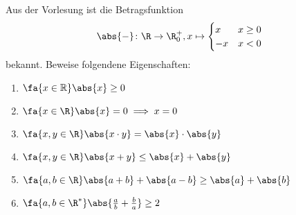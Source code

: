 \begin{exercise}
  Aus der Vorlesung ist die Betragsfunktion 
  \[
    \abs{{-}} \colon \R \to \R^{+}_{0}, x \mapsto
    \begin{cases}
      x  & x \geq 0 \\
      -x & x < 0    \\
    \end{cases}
  \]
  bekannt. Beweise folgendene Eigenschaften:
  \begin{enumerate}
  \item \(\fa{x \in \mathbb{R}} \abs{x} \geq 0\)
  \item \(\fa{x \in \R} \abs{x} = 0 \implies x = 0\)
  \item \(\fa{x, y \in \R} \abs{x \cdot y} = \abs{x} \cdot \abs{y}\)
  \item \(\fa{x, y \in \R} \abs{x + y} \leq \abs{x} + \abs{y}\)
  \item \(\fa{a,b \in \R} \abs{a + b} + \abs{a - b} \geq \abs{a} + \abs{b}\)
  \item \(\fa{a,b \in \R^*} \abs{\frac{a}{b} + \frac{b}{a}} \geq 2\)
  \end{enumerate}
\end{exercise}
